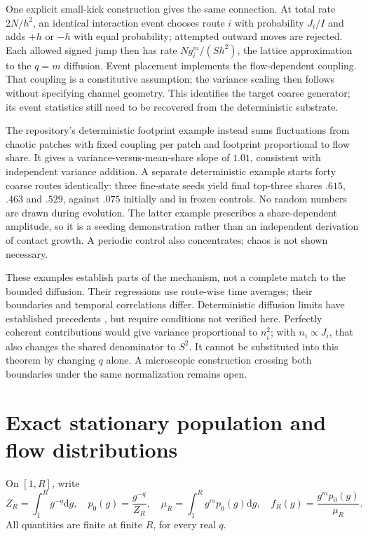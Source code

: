 \documentclass[11pt,a4paper]{article}
\newcommand{\dd}{\mathrm{d}}
\begin{document}
One explicit small-kick construction gives the same connection. At total rate
$2N/h^2$, an identical interaction event chooses route $i$ with probability $J_i/I$
and adds $+h$ or $-h$ with equal probability; attempted outward moves are rejected.
Each allowed signed jump then has rate $Ng_i^m/(Sh^2)$, the lattice approximation
to the $q=m$ diffusion. Event placement implements the flow-dependent coupling. That coupling is a
constitutive assumption; the variance scaling then follows without specifying
channel geometry. This identifies
the target coarse generator; its event statistics still need to be recovered
from the deterministic substrate.

The repository's deterministic footprint example instead sums fluctuations from
chaotic patches with fixed coupling per patch and footprint proportional to flow
share. It gives a variance-versus-mean-share slope of $1.01$, consistent with
independent variance addition. A separate deterministic example starts forty
coarse routes identically: three fine-state seeds yield final top-three shares
$.615$, $.463$ and $.529$, against $.075$ initially and in frozen controls.
No random numbers are drawn during evolution. The latter example prescribes a
share-dependent amplitude, so it is a seeding demonstration rather than an
independent derivation of contact growth. A periodic control also concentrates;
chaos is not shown necessary.

These examples establish parts of the mechanism, not a complete match to the
bounded diffusion. Their regressions use route-wise time averages; their boundaries
and temporal correlations differ. Deterministic diffusion limits have established
precedents \cite{melbourne,gottwald}, but require conditions not verified here.
Perfectly coherent contributions would give variance proportional to $n_i^2$;
with $n_i\propto J_i$, that also changes the shared denominator to $S^2$.
It cannot be substituted into this theorem by changing $q$ alone. A microscopic
construction crossing both boundaries under the same normalization remains open.

\section{Exact stationary population and flow distributions}

On $[1,R]$, write
\begin{equation}
 Z_R=\int_1^R g^{-q}\dd g,\quad p_0(g)=\frac{g^{-q}}{Z_R},\quad
 \mu_R=\int_1^R g^m p_0(g)\dd g,\quad
 f_R(g)=\frac{g^m p_0(g)}{\mu_R}.
 \label{eq:base}
\end{equation}
All quantities are finite at finite $R$, for every real $q$.
\end{document}
